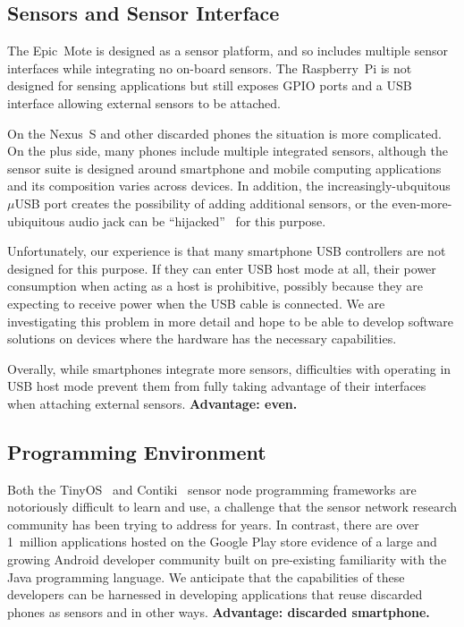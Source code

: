 \subsection{Sensors and Sensor Interface}

The Epic~Mote is designed as a sensor platform, and so includes multiple
sensor interfaces while integrating no on-board sensors. The Raspberry~Pi is
not designed for sensing applications but still exposes GPIO ports and a USB
interface allowing external sensors to be attached.

On the Nexus~S and other discarded phones the situation is more complicated.
On the plus side, many phones include multiple integrated sensors, although
the sensor suite is designed around smartphone and mobile computing
applications and its composition varies across devices. In addition, the
increasingly-ubquitous $\mu$USB port creates the possibility of adding
additional sensors, or the even-more-ubiquitous audio jack can be
``hijacked''~\cite{FIXME-audiohijack} for this purpose.

Unfortunately, our experience is that many smartphone USB controllers are not
designed for this purpose. If they can enter USB host mode at all, their
power consumption when acting as a host is prohibitive, possibly because they
are expecting to receive power when the USB cable is connected. We are investigating this problem in more
detail and hope to be able to develop software solutions on devices where the
hardware has the necessary capabilities.

Overally, while smartphones integrate more sensors, difficulties with
operating in USB host mode prevent them from fully taking advantage of their
interfaces when attaching external sensors. \textbf{Advantage: even.}

\subsection{Programming Environment}

Both the TinyOS~\cite{tinyos} and Contiki~\cite{contiki} sensor node
programming frameworks are notoriously difficult to learn and use, a
challenge that the sensor network research community has been trying to
address for years. In contrast, there are over 1~million applications hosted
on the Google Play store  evidence of a large and growing Android
developer community built on pre-existing familiarity with the Java
programming language. We anticipate that the capabilities of these developers
can be harnessed in developing applications that reuse discarded phones as
sensors and in other ways. \textbf{Advantage: discarded smartphone.}


